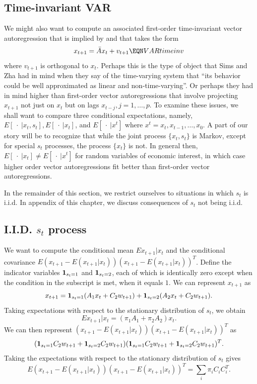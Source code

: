 \subsection{Time-invariant VAR}
 We might also want to compute an associated first-order
  time-invariant vector autoregression that is implied by    and that takes the form
  $$ x_{t+1} = \bar A x_t + v_{t+1} \EQN VARtimeinv$$
  where $v_{t+1}$ is orthogonal to $x_t$. 
  Perhaps this is the type of  object that Sims and Zha had  in mind
  when they say of the time-varying system that ``its behavior could be well approximated as linear and non-time-varying''. Or perhaps they had in mind higher than first-order vector autoregressions 
  that involve projecting $x_{t+1}$ not just on $x_t$ but on lags $x_{t-j}, j= 1, \ldots, p$.
To examine these issues, we shall want to compare three  conditional expectations, namely,
$ E [ \ \cdot \  | x_t, s_t], E [ \ \cdot \ | x_t ]$, and $E [ \ \cdot \ | x^t ]$
where $x^t = x_t, x_{t-1}, \ldots, x_0$. A part of our story  will be to recognize that while the joint process $\{x_t, s_t\}$ is Markov, except for special $s_t$ processes,  the process $\{ x_t \}$ is not. In general then,  $ E [ \ \cdot \ | x_t ] \neq E [ \ \cdot \ | x^t ]$
for random variables of economic interest, in which case higher order vector autoregressions fit better than 
first-order vector autoregressions.

In the remainder of this section, we restrict ourselves to situations in which $s_t$ is i.i.d.  In appendix   of this chapter, we discuss consequences of $s_t$ not being i.i.d.



\subsection{I.I.D. $s_t$ process}

We want to compute the conditional mean $E x_{t+1} | x_t$ and the conditional covariance 
$ E (x_{t+1} - E(x_{t+1}| x_t))(x_{t+1} - E(x_{t+1}| x_t))^T$.  Define the indicator variables
${\bf 1}_{s_t=1}$ and ${\bf 1}_{s_t=2}$, each of which is identically zero except when the condition in the subscript is met, when it equals $1$.   We can represent $x_{t+1}$ as 
$$
x_{t+1} = {\bf 1}_{s_t = 1} (A_1 x_t + C_2 w_{t+1}) + {\bf 1}_{s_t =2} (A_2 x_t + C_2 w_{t+1} ).
$$
Taking expectations with respect to the stationary distribution of $s_t$, we obtain
$$
E x_{t+1} | x_t = (\pi_1 A_1 + \pi_2 A_2 ) x_t.
$$
We can then represent $(x_{t+1} - E(x_{t+1}| x_t))(x_{t+1} - E(x_{t+1}| x_t))^T$ as 
$$ 
({\bf 1}_{s_t = 1}  C_2 w_{t+1} + {\bf 1}_{s_t =2}  C_2 w_{t+1})({\bf 1}_{s_t = 1}  C_2 w_{t+1} + {\bf 1}_{s_t =2}  C_2 w_{t+1})^T .
$$
Taking the expectations with respect to the stationary distribution of $s_t$ gives
$$ E (x_{t+1} - E(x_{t+1}| x_t))(x_{t+1} - E(x_{t+1}| x_t))^T = \sum_i \pi_i C_i C_i^T .
$$


